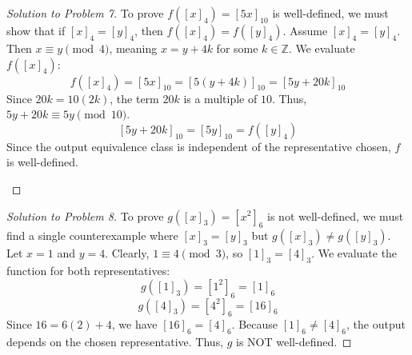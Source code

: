 \documentclass[11pt, a4paper]{article}
\theoremstyle{definition}
\theoremstyle{remark}
\newcommand{\Z}{\mathbb{Z}}
\begin{document}
\begin{proof}[Solution to Problem 7]
To prove $f([x]_4) = [5x]_{10}$ is well-defined, we must show that if $[x]_4 = [y]_4$, then $f([x]_4) = f([y]_4)$.
Assume $[x]_4 = [y]_4$. Then $x \equiv y \pmod 4$, meaning $x = y + 4k$ for some $k \in \Z$.
We evaluate $f([x]_4)$:
\[ f([x]_4) = [5x]_{10} = [5(y + 4k)]_{10} = [5y + 20k]_{10} \]
Since $20k = 10(2k)$, the term $20k$ is a multiple of $10$. Thus, $5y + 20k \equiv 5y \pmod{10}$.
\[ [5y + 20k]_{10} = [5y]_{10} = f([y]_4) \]
Since the output equivalence class is independent of the representative chosen, $f$ is well-defined.

\vspace{1em}
\begin{center}
\end{center}
\end{proof}

\begin{proof}[Solution to Problem 8]
To prove $g([x]_3) = [x^2]_6$ is not well-defined, we must find a single counterexample where $[x]_3 = [y]_3$ but $g([x]_3) \neq g([y]_3)$.
Let $x = 1$ and $y = 4$. Clearly, $1 \equiv 4 \pmod 3$, so $[1]_3 = [4]_3$.
We evaluate the function for both representatives:
\[ g([1]_3) = [1^2]_6 = [1]_6 \]
\[ g([4]_3) = [4^2]_6 = [16]_6 \]
Since $16 = 6(2) + 4$, we have $[16]_6 = [4]_6$.
Because $[1]_6 \neq [4]_6$, the output depends on the chosen representative. Thus, $g$ is NOT well-defined.
\end{proof}
\end{document}

